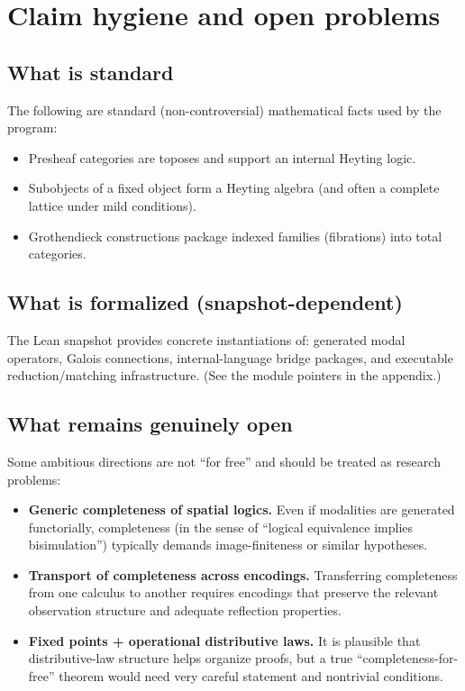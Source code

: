 \documentclass[11pt]{article}
\begin{document}
\section{Claim hygiene and open problems}

\subsection{What is standard}
The following are standard (non-controversial) mathematical facts used by the program:

\begin{itemize}
\item Presheaf categories are toposes and support an internal Heyting logic.
\item Subobjects of a fixed object form a Heyting algebra (and often a complete lattice under mild conditions).
\item Grothendieck constructions package indexed families (fibrations) into total categories.
\end{itemize}

\subsection{What is formalized (snapshot-dependent)}
The Lean snapshot provides concrete instantiations of:
generated modal operators, Galois connections, internal-language bridge packages,
and executable reduction/matching infrastructure.
(See the module pointers in the appendix.)

\subsection{What remains genuinely open}
Some ambitious directions are not ``for free'' and should be treated as research problems:

\begin{itemize}
\item \textbf{Generic completeness of spatial logics.}
Even if modalities are generated functorially, completeness (in the sense of
``logical equivalence implies bisimulation'') typically demands image-finiteness or similar hypotheses.
\item \textbf{Transport of completeness across encodings.}
Transferring completeness from one calculus to another requires encodings that preserve
the relevant observation structure and adequate reflection properties.
\item \textbf{Fixed points + operational distributive laws.}
It is plausible that distributive-law structure helps organize proofs, but a true
``completeness-for-free'' theorem would need very careful statement and nontrivial conditions.
\end{itemize}
\end{document}

